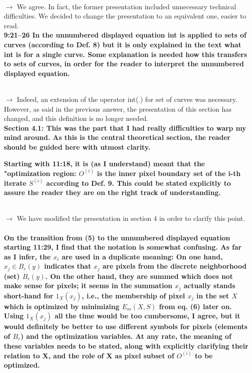 \documentclass[12pt]{article}
\begin{document}
~\\
$\rightarrow$ We agree. In fact, the former presentation included unnecessary technical difficulties. We decided to change the presentation to an equivalent one, easier to read.
~\\

\textbf{9:21--26 In the unnumbered displayed equation int is applied to sets of curves (according to Def. 8) but it is only explained in the text what int is for a single curve. Some explanation is needed how this transfers to sets of curves, in order for the reader to interpret the unnumbered displayed equation.}

~\\
$\rightarrow$ Indeed, an extension of the operator int(.) for set of curves was necessary. However, as said in the
previous answer, the presentation of this section has changed, and this definition is no longer needed.
~\\

\textbf{Section 4.1: This was the part that I had really difficulties to warp my mind
around. As this is the central theoretical section, the reader should be
guided here with utmost clarity.}


\textbf{Starting with 11:18, it is (as I understand) meant that the "optimization
region: $O^{(i)}$ is the inner pixel boundary set of the i-th iterate $S^{(i)}$
according to Def. 9. This could be stated explicitly to assure the reader they
are on the right track of understanding.}

~\\
$\rightarrow$ We have modified the presentation in section 4 in order to clarify this point.
~\\

\textbf{On the transition from (5) to the unnumbered displayed equation starting 11:29, I find that the notation is somewhat confusing. As far as I infer, the $x_i$ are used in a duplicate meaning: On one hand, $x_j\in B_r(y)$ indicates that $x_j$ are pixels from the discrete neighborhood (set) $B_r(y)$. On the other hand, they are summed which does not make sense for pixels; it seems in the summation $x_j$ actually stands short-hand for $1_X(x_j)$, i.e., the membership of pixel $x_j$ in the set $X$ which is optimized by minimizing $E_m(X,S)$ from eq. (6) later on. Using $1_X(x_j)$ all the time would be too cumbersome, I agree, but it would definitely be better to use different symbols for pixels (elements of $B_r$) and the optimization variables. At any rate, the meaning of these variables needs to be stated, along with explicitly clarifying their relation to X, and the role of X as pixel subset of $O^{(i)}$ to be optimized.}
\end{document}
